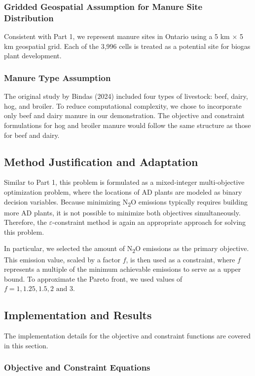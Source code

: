 \documentclass[12pt]{article}
\begin{document}
\subsubsection{Gridded Geospatial Assumption for Manure Site Distribution}
Consistent with Part 1, we represent manure sites in Ontario using a 5 km × 5 km geospatial grid. Each of the 3,996 cells is treated as a potential site for biogas plant development.

\subsubsection{Manure Type Assumption}
The original study by Bindas (2024) included four types of livestock: beef, dairy, hog, and broiler. To reduce computational complexity, we chose to incorporate only beef and dairy manure in our demonstration. The objective and constraint formulations for hog and broiler manure would follow the same structure as those for beef and dairy.

\subsection{Method Justification and Adaptation}
Similar to Part 1, this problem is formulated as a mixed-integer multi-objective optimization problem, where the locations of AD plants are modeled as binary decision variables. Because minimizing N\textsubscript{2}O emissions typically requires building more AD plants, it is not possible to minimize both objectives simultaneously. Therefore, the $\varepsilon$-constraint method is again an appropriate approach for solving this problem.

In particular, we selected the amount of N\textsubscript{2}O emissions as the primary objective. This emission value, scaled by a factor $f$, is then used as a constraint, where $f$ represents a multiple of the minimum achievable emissions to serve as a upper bound. To approximate the Pareto front, we used values of $f=1, 1.25, 1.5, 2 \text{ and } 3$.

\subsection{Implementation and Results}
The implementation details for the objective and constraint functions are covered in this section.

\subsubsection{Objective and Constraint Equations}
\end{document}
